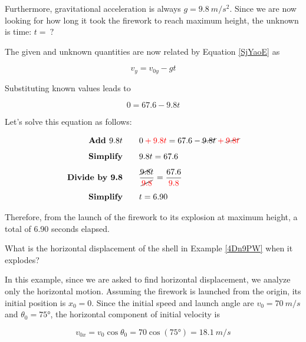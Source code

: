 \documentclass[main.tex]{subfiles}
\begin{document}
Furthermore, gravitational acceleration is always $g = \SI{9.8}{m/s^2}$. Since we are now looking for how long it took the firework to reach maximum height, the unknown is time: $t =\ ?$

\vspace{1em}

The given and unknown quantities are now related by Equation \eqref{SjYaoE} as 

\begin{equation*}
    v_y = v_{0y} - gt
\end{equation*}

Substituting known values leads to

\begin{equation*}
    0 = 67.6 - 9.8 t
\end{equation*}

Let's solve this equation as follows:

\begin{align*}
    \textbf{Add $9.8 t$} \qquad & 0 \mathbin{\color{red} +} \textcolor{red}{9.8 t} = 67.6 - \cancel{9.8 t} \mathbin{\color{red} +} \cancel{\textcolor{red}{9.8 t}}\\[1ex]
    \textbf{Simplify} \qquad & 9.8 t = 67.6\\[1ex]
    \textbf{Divide by 9.8} \qquad & \frac{\cancel{9.8} t}{\cancel{\textcolor{red}{9.8}}} = \frac{67.6}{\textcolor{red}{9.8}}\\[1ex]
    \textbf{Simplify} \qquad & t = 6.90
\end{align*}

Therefore, from the launch of the firework to its explosion at maximum height, a total of 6.90 seconds elapsed.

\solutionEnd

\begin{example} 
    What is the horizontal displacement of the shell in Example \ref{4Dn9PW} when it explodes?
\end{example}

\Solution In this example, since we are asked to find horizontal displacement, we analyze only the horizontal motion. Assuming the firework is launched from the origin, its initial position is $x_0 = 0$. Since the initial speed and launch angle are $v_0 = \SI{70}{m/s}$ and $\theta_0 = \ang{75}$,  the horizontal component of initial velocity is

\begin{equation*}
    v_{0x} = v_0 \cos{\theta_0} = 70 \cos{(\ang{75})} = \SI{18.1}{m/s}
\end{equation*}
\end{document}
